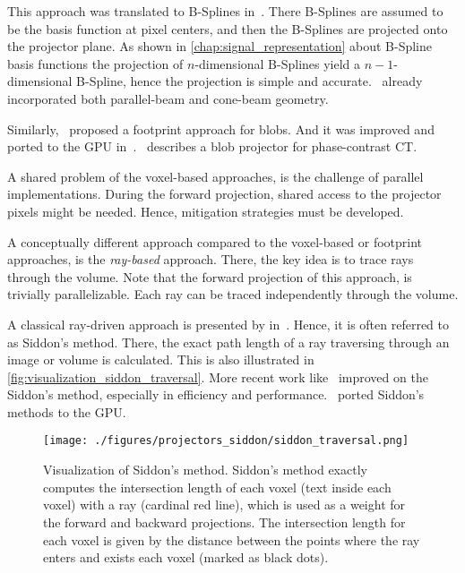 This approach was translated to B-Splines in~\cite{momey_b-spline_2012, momey_spline_2015}. There
B-Splines are assumed to be the basis function at pixel centers, and then the B-Splines are
projected onto the projector plane. As shown in \autoref{chap:signal_representation} about B-Spline
basis functions the projection of \(n\)-dimensional B-Splines yield a \(n-1\)-dimensional B-Spline,
hence the projection is simple and accurate.~\cite{momey_b-spline_2012} already incorporated both
parallel-beam and cone-beam geometry.

Similarly,~\cite{ziegler_efficient_2006} proposed a footprint approach for blobs. And it was
improved and ported to the \gls{GPU} in~\cite{bippus_projector_2011}.~\cite{kohler_iterative_2011}
describes a blob projector for phase-contrast CT\@.

A shared problem of the voxel-based approaches, is the challenge of parallel implementations. During
the forward projection, shared access to the projector pixels might be needed. Hence, mitigation
strategies must be developed.

A conceptually different approach compared to the voxel-based or footprint approaches, is the
\textit{ray-based} approach. There, the key idea is to trace rays through the volume. Note that the
forward projection of this approach, is trivially parallelizable. Each ray can be traced
independently through the volume.

A classical ray-driven approach is presented by \citeauthor*{siddon_fast_1985}
in~\cite{siddon_fast_1985}. Hence, it is often referred to as Siddon's method. There, the exact path
length of a ray traversing through an image or volume is calculated. This is also illustrated in
\autoref{fig:visualization_siddon_traversal}. More recent work
like~\cite{jacobs_fast_1998,christiaens_fast_1999,zhao_fast_2004, gao_fast_2012} improved on the
Siddon's method, especially in efficiency and
performance.~\cite{de_greef_accelerated_2009,xiao_efficient_2012} ported Siddon's methods to the
\gls{GPU}\@.

\begin{figure}
	\centering
	\texttt{[image: ./figures/projectors\_siddon/siddon\_traversal.png]}
	\caption{Visualization of Siddon's method. Siddon's method exactly computes the intersection
		length of each voxel (text inside each voxel) with a ray (cardinal red line), which
		is used as a weight for the forward and backward projections. The intersection
		length for each voxel is given by the distance between the points where the ray
		enters and exists each voxel (marked as black
		dots).}\label{fig:visualization_siddon_traversal}
\end{figure}

